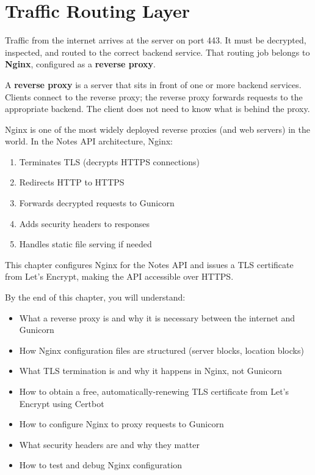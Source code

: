\setcounter{chapter}{27}
\chapter{Traffic Routing Layer}\label{ch:28-traffic-routing}

\chapterrule

Traffic from the internet arrives at the server on port 443. It must be decrypted, inspected, and routed to the correct backend service. That routing job belongs to \textbf{Nginx}, configured as a \textbf{reverse proxy}.

A \textbf{reverse proxy} is a server that sits in front of one or more backend services. Clients connect to the reverse proxy; the reverse proxy forwards requests to the appropriate backend. The client does not need to know what is behind the proxy.

Nginx is one of the most widely deployed reverse proxies (and web servers) in the world. In the Notes API architecture, Nginx:

\begin{enumerate}
\def\labelenumi{\arabic{enumi}.}
\tightlist
\item
  Terminates TLS (decrypts HTTPS connections)
\item
  Redirects HTTP to HTTPS
\item
  Forwards decrypted requests to Gunicorn
\item
  Adds security headers to responses
\item
  Handles static file serving if needed
\end{enumerate}

\noindent{}This chapter configures Nginx for the Notes API and issues a TLS certificate from Let's Encrypt, making the API accessible over HTTPS.

\begin{objectives}

By the end of this chapter, you will understand:

\begin{itemize}
\tightlist
\item
  What a reverse proxy is and why it is necessary between the internet and Gunicorn
\item
  How Nginx configuration files are structured (server blocks, location blocks)
\item
  What TLS termination is and why it happens in Nginx, not Gunicorn
\item
  How to obtain a free, automatically-renewing TLS certificate from Let's Encrypt using Certbot
\item
  How to configure Nginx to proxy requests to Gunicorn
\item
  What security headers are and why they matter
\item
  How to test and debug Nginx configuration
\end{itemize}

\end{objectives}

